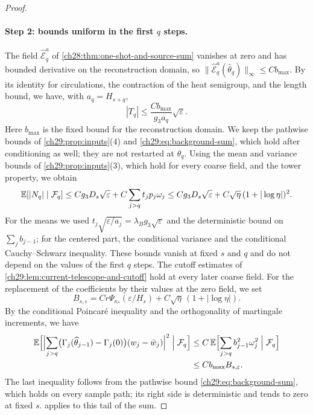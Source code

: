 \begin{proof}
\paragraph{Step 2: bounds uniform in the first $q$ steps.}
The field $\widehat{\mathcal E}_q^a$ of \cref{ch28:thm:one-shot-and-source-sum} vanishes at zero and has bounded derivative on the reconstruction domain, so $\|\widehat{\mathcal E}_q^a(\widehat\theta_q)\|_\infty\le Cb_{\max}$. By its identity for circulations, the contraction of the heat semigroup, and the length bound, we have, with $a_q=H_{s+q}$,
\[
 |T_q|\le\frac{Cb_{\max}}{g_3a_q}\sqrt\varepsilon.
\]
Here $b_{\max}$ is the fixed bound for the reconstruction domain. We keep the pathwise bounds of \cref{ch29:prop:inputs}(4) and \eqref{ch29:eq:background-sum}, which hold after conditioning as well; they are not restarted at $\widehat\theta_q$. Using the mean and variance bounds of \cref{ch29:prop:inputs}(3), which hold for every coarse field, and the tower property, we obtain
\[
 \mathbb E[|N_q|\mid\mathcal F_q]\le Cg_3D_s\sqrt\varepsilon+C\sum_{j>q}t_jp_j\omega_j\le Cg_3D_s\sqrt\varepsilon+C\sqrt\eta\,(1+|\log\eta|)^2.
\]
For the means we used $t_j\sqrt{\varepsilon/a_j}=\lambda_Bg_3\sqrt\varepsilon$ and the deterministic bound on $\sum_jb_{j-1}$; for the centered part, the conditional variance and the conditional Cauchy--Schwarz inequality. These bounds vanish at fixed $s$ and $q$ and do not depend on the values of the first $q$ steps. The cutoff estimates of \cref{ch29:lem:current-telescope-and-cutoff} hold at every later coarse field. For the replacement of the coefficients by their values at the zero field, we set
\[
 B_{s,\varepsilon}=Cr\Psi_{\kappa_*}(\varepsilon/H_s)+C\sqrt\eta\,(1+|\log\eta|).
\]
By the conditional Poincaré inequality and the orthogonality of martingale increments, we have
\begin{align*}
 \mathbb E\Bigl[\Bigl|\sum_{j>q}\bigl(\Gamma_j(\widehat\theta_{j-1})-\Gamma_j(0)\bigr)(w_j-\bar w_j)\Bigr|^2\Bigm|\mathcal F_q\Bigr]
 &\le C\,\mathbb E\Bigl[\sum_{j>q}b_{j-1}^2\omega_j^2\Bigm|\mathcal F_q\Bigr]\\
 &\le Cb_{\max}B_{s,\varepsilon}.
\end{align*}
The last inequality follows from the pathwise bound \eqref{ch29:eq:background-sum}, which holds on every sample path; its right side is deterministic and tends to zero at fixed $s$.  applies to this tail of the sum.


\end{proof}
